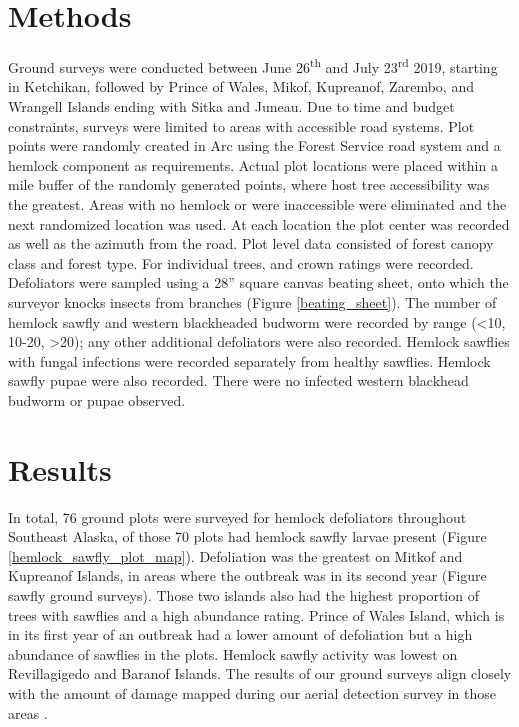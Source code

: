 \begin{multicols}{2}
\section{Methods}

Ground surveys were conducted between June 26\textsuperscript{th} and July 23\textsuperscript{rd} 2019, starting in Ketchikan, followed by Prince of Wales, Mikof, Kupreanof, Zarembo, and Wrangell Islands ending with Sitka and Juneau.  Due to time and budget constraints, surveys were limited to areas with accessible road systems.  Plot points were randomly created in Arc using the Forest Service road system and a hemlock component as requirements.  Actual plot locations were placed within a  mile buffer of the randomly generated points, where host tree accessibility was the greatest.  Areas with no hemlock or were inaccessible were eliminated and the next randomized location was used.   At each location the plot center was recorded as well as the azimuth from the road.  Plot level data consisted of forest canopy class and forest type. For individual trees,  and crown ratings were recorded. Defoliators were sampled using a 28” square canvas beating sheet, onto which the surveyor knocks insects from branches (Figure \ref{beating_sheet}).  The number of hemlock sawfly and western blackheaded budworm were recorded by range (<10, 10-20, >20); any other additional defoliators were also recorded.  Hemlock sawflies with fungal infections were recorded separately from healthy sawflies.  Hemlock sawfly pupae were also recorded.  There were no infected western blackhead budworm or pupae observed. 

\section{Results}
 
In total, 76 ground plots were surveyed for hemlock defoliators throughout Southeast Alaska, of those 70 plots had hemlock sawfly larvae present (Figure \ref{hemlock_sawfly_plot_map}).  Defoliation was the greatest on Mitkof and Kupreanof Islands, in areas where the outbreak was in its second year (Figure sawfly ground surveys).  Those two islands also had the highest proportion of trees with sawflies and a high abundance rating.  Prince of Wales Island, which is in its first year of an outbreak had a lower amount of defoliation but a high abundance of sawflies in the plots. Hemlock sawfly activity was lowest on Revillagigedo and Baranof Islands.   The results of our ground surveys align closely with the amount of damage mapped during our aerial detection survey in those areas \citep[see][]{Duboisetal2020}. 


\end{multicols}
